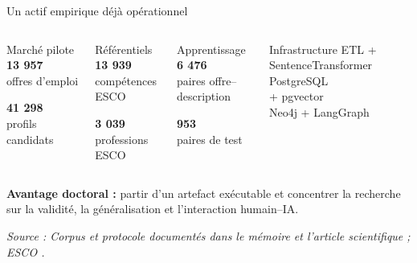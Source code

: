 \documentclass[aspectratio=169,11pt]{beamer}
\newcommand{\metric}[1]{\textcolor{KmerNavy}{\bfseries #1}}
\newcommand{\sourceNote}[1]{%
  \vfill\par\tiny\color{KmerDarkGray}\textit{Source : #1}\par
}
\begin{document}
\begin{frame}{Un actif empirique déjà opérationnel}
  \begin{columns}[T,onlytextwidth]
      \begin{block}{Marché pilote}
        \centering\metric{13 957}\\offres d'emploi\par
        \vspace{0.18cm}\metric{41 298}\\profils candidats
      \end{block}
      \begin{block}{Référentiels}
        \centering\metric{13 939}\\compétences ESCO\par
        \vspace{0.18cm}\metric{3 039}\\professions ESCO
      \end{block}
      \begin{block}{Apprentissage}
        \centering\metric{6 476}\\paires offre--description\par
        \vspace{0.18cm}\metric{953}\\paires de test
      \end{block}
      \begin{block}{Infrastructure}
        \centering ETL + SentenceTransformer\\
        PostgreSQL\\+ pgvector\\Neo4j + LangGraph
      \end{block}
  \end{columns}
  \vspace{0.30cm}
  \begin{center}
    \textbf{Avantage doctoral :} partir d'un artefact exécutable et concentrer la
    recherche sur la validité, la généralisation et l'interaction humain--IA.
  \end{center}
  \sourceNote{Corpus et protocole documentés dans le mémoire et l'article scientifique ; ESCO \citep{europeancommission2024esco}.}
\end{frame}
\end{document}
